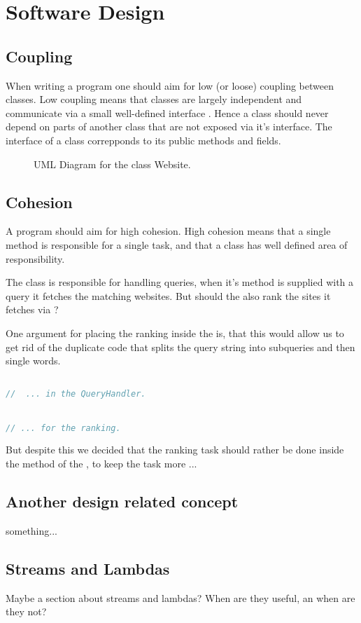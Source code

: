  \section{Software Design}

 \subsection{Coupling}
 When writing a program one should aim for low (or loose) coupling between classes. Low coupling means that classes are largely independent and communicate via a small well-defined interface \cite[p.259]{BK}. Hence a class should never depend on parts of another class that are not exposed via it's interface. The interface of a class correpponds to its public methods and fields. 
 
 
 \begin{figure}[t]
 	\centering
 	\caption{UML Diagram for the class Website.}
 	\label{fig:uml:single-class-website}
 \end{figure}


\subsection{Cohesion}
A program should aim for high cohesion. High cohesion means that a single method is responsible for a single task, and that a class has well defined area of responsibility. 

The class  is responsible for handling queries, when it's method  is supplied with a query it fetches the matching websites. But should the  also rank the sites it fetches via ? 

One argument for placing the ranking inside the  is, that this would allow us to get rid of the duplicate code that splits the query string into subqueries and then single words.  
      
\begin{lstlisting}[language=Java, caption=Splitting a query into single words.]

//  ... in the QueryHandler.


// ... for the ranking.

\end{lstlisting}
 

But despite this we decided that the ranking task should rather be done inside the  method of the , to keep the task more ...

 

\subsection{Another design related concept}
something...
 
\subsection{Streams and Lambdas}
Maybe a section about streams and lambdas? When are they useful, an when are they not?


 
